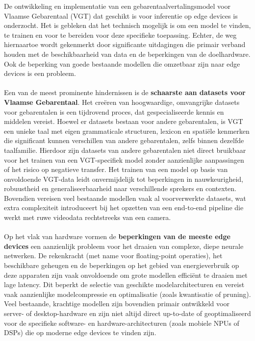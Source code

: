 De ontwikkeling en implementatie van een gebarentaalvertalingsmodel voor Vlaamse Gebarentaal (VGT) dat geschikt is voor inferentie op edge devices is onderzocht. 
Het is gebleken dat het technisch mogelijk is om een model te vinden, te trainen en voor te bereiden voor deze specifieke toepassing. 
Echter, de weg hiernaartoe wordt gekenmerkt door significante uitdagingen die primair verband houden met de beschikbaarheid van data en de beperkingen van de doelhardware.
Ook de beperking van goede bestaande modellen die omzetbaar zijn naar edge devices is een probleem.
\\
\\
Een van de meest prominente hindernissen is de \textbf{schaarste aan datasets voor Vlaamse Gebarentaal}. 
Het creëren van hoogwaardige, omvangrijke datasets voor gebarentalen is een tijdrovend proces, dat gespecialiseerde kennis en middelen vereist.
Hoewel er datasets bestaan voor andere gebarentalen, is VGT een unieke taal met eigen grammaticale structuren, lexicon en spatiële kenmerken die significant kunnen verschillen van andere gebarentalen, zelfs binnen dezelfde taalfamilie. 
Hierdoor zijn datasets van andere gebarentalen niet direct bruikbaar voor het trainen van een VGT-specifiek model zonder aanzienlijke aanpassingen of het risico op negatieve transfer. 
Het trainen van een model op basis van onvoldoende VGT-data leidt onvermijdelijk tot beperkingen in nauwkeurigheid, robuustheid en generaliseerbaarheid naar verschillende sprekers en contexten. 
Bovendien vereisen veel bestaande modellen vaak al voorverwerkte datasets, wat extra complexiteit introduceert bij het opzetten van een end-to-end pipeline die werkt met ruwe videodata rechtstreeks van een camera.
\\
\\
Op het vlak van hardware vormen de \textbf{beperkingen van de meeste edge devices} een aanzienlijk probleem voor het draaien van complexe, diepe neurale netwerken. 
De rekenkracht (met name voor floating-point operaties), het beschikbare geheugen en de beperkingen op het gebied van energieverbruik op deze apparaten zijn vaak onvoldoende om grote modellen efficiënt te draaien met lage latency. 
Dit beperkt de selectie van geschikte modelarchitecturen en vereist vaak aanzienlijke modelcompressie en optimalisatie (zoals kwantisatie of pruning). 
Veel bestaande, krachtige modellen zijn bovendien primair ontwikkeld voor server- of desktop-hardware en zijn niet altijd direct up-to-date of geoptimaliseerd voor de specifieke software- en hardware-architecturen (zoals mobiele NPUs of DSPs) die op moderne edge devices te vinden zijn.
